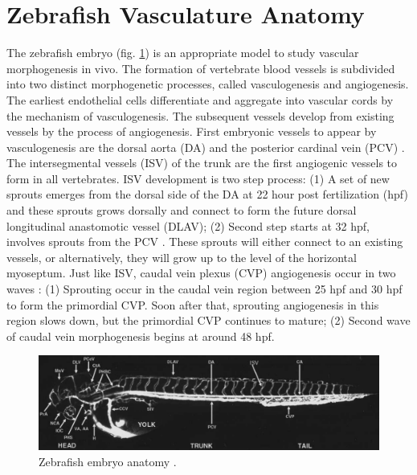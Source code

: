 \section{Zebrafish Vasculature Anatomy}

The zebrafish embryo (fig. \ref{anatomy}) is an appropriate model to study vascular morphogenesis in vivo. The formation of vertebrate blood vessels is subdivided into two distinct morphogenetic processes, called vasculogenesis and angiogenesis. The earliest endothelial cells differentiate and aggregate into vascular cords by the mechanism of vasculogenesis. The subsequent vessels develop from existing vessels by the process of angiogenesis. First embryonic vessels to appear by vasculogenesis are the dorsal aorta (DA) and the posterior cardinal vein (PCV) \cite{isogai01}. The intersegmental vessels (ISV) of the trunk are the first angiogenic vessels to form in all vertebrates. ISV development is two step process: (1)  A set of new sprouts emerges from the dorsal side of the DA at 22 hour post fertilization (hpf) and these sprouts grows dorsally and connect to form the future dorsal longitudinal anastomotic vessel (DLAV); (2) Second step starts at 32 hpf, involves sprouts from the PCV \cite{yaniv2006}. These sprouts will either connect to an existing vessels, or alternatively, they will grow up to the level of the horizontal myoseptum. Just like ISV, caudal vein plexus (CVP) angiogenesis occur in two waves \cite{choi2011}: (1) Sprouting  occur in the caudal vein region between 25 hpf and 30 hpf to form the primordial CVP. Soon after that, sprouting angiogenesis in this region slows down, but the primordial CVP continues to mature; (2) Second wave of caudal vein morphogenesis begins at around 48 hpf.

\begin{figure}[htb] 
 \begin{center}
    \includegraphics[scale=0.45]{figure/anatomy}
  \end{center}
  \caption[Zebrafish embryo anatomy]{Zebrafish embryo anatomy \cite{isogai01}.}
 \label{anatomy}
\end{figure}
\par

